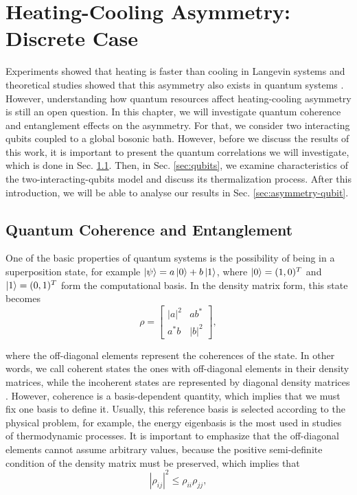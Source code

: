 


\chapter{Heating-Cooling Asymmetry: Discrete Case}\label{cap:results-discrete}

Experiments showed that heating is faster than cooling in Langevin systems \cite{ibanez-2024} and theoretical studies showed that this asymmetry also exists in quantum systems \cite{tejero-2025}. However, understanding how quantum resources affect heating-cooling asymmetry is still an open question. In this chapter, we will investigate quantum coherence and entanglement effects on the asymmetry. For that, we consider two interacting qubits coupled to a global bosonic bath. However, before we discuss the results of this work, it is important to present the quantum correlations we will investigate, which is done in Sec. \ref{sec:correlations}. Then, in Sec. \ref{sec:qubits}, we examine characteristics of the two-interacting-qubits model and discuss its thermalization process. After this introduction, we will be able to analyse our results in Sec. \ref{sec:asymmetry-qubit}.


\section{Quantum Coherence and Entanglement} \label{sec:correlations}

One of the basic properties of quantum systems is the possibility of being in a superposition state, for example $\ket{\psi} = a \ket{0} + b \ket{1}$, where $\ket{0} = (1,0)^T$ and $\ket{1} = (0,1)^T$ form the computational basis. In the density matrix form, this state becomes
\begin{equation}
    \rho = 
    \begin{bmatrix}
        |a|^2 & ab^*\\
        a^* b & |b|^2
    \end{bmatrix},
\end{equation}

\noindent where the off-diagonal elements represent the coherences of the state. In other words, we call coherent states the ones with off-diagonal elements in their density matrices, while the incoherent states are represented by diagonal density matrices \cite{streltsov-2017, baumgratz-2014}. However, coherence is a basis-dependent quantity, which implies that we must fix one basis to define it. Usually, this reference basis is selected according to the physical problem, for example, the energy eigenbasis is the most used in studies of thermodynamic processes. It is important to emphasize that the off-diagonal elements cannot assume arbitrary values, because the positive semi-definite condition of the density matrix must be preserved, which implies that
\begin{equation}
    |{\rho}_{ij}|^2 \leq {\rho}_{ii} {\rho}_{jj},
    \label{eq:coherence-positivity}
\end{equation}


